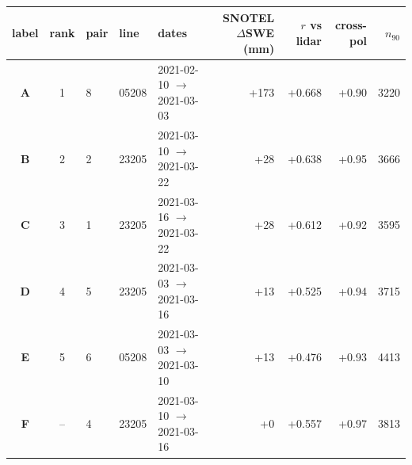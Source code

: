 \begin{tabular}{cclllrrrr}
\hline
label & rank & pair & line & dates & SNOTEL $\Delta$SWE (mm) & $r$ vs lidar & cross-pol & $n_{90}$ \\
\hline
\textbf{A} & 1 & 8 & 05208 & 2021-02-10 $\rightarrow$ 2021-03-03 & +173 & +0.668 & +0.90 & 3220 \\
\textbf{B} & 2 & 2 & 23205 & 2021-03-10 $\rightarrow$ 2021-03-22 & +28 & +0.638 & +0.95 & 3666 \\
\textbf{C} & 3 & 1 & 23205 & 2021-03-16 $\rightarrow$ 2021-03-22 & +28 & +0.612 & +0.92 & 3595 \\
\textbf{D} & 4 & 5 & 23205 & 2021-03-03 $\rightarrow$ 2021-03-16 & +13 & +0.525 & +0.94 & 3715 \\
\textbf{E} & 5 & 6 & 05208 & 2021-03-03 $\rightarrow$ 2021-03-10 & +13 & +0.476 & +0.93 & 4413 \\
\hline
\textbf{F} & -- & 4 & 23205 & 2021-03-10 $\rightarrow$ 2021-03-16 & +0 & +0.557 & +0.97 & 3813 \\
\hline
\end{tabular}

